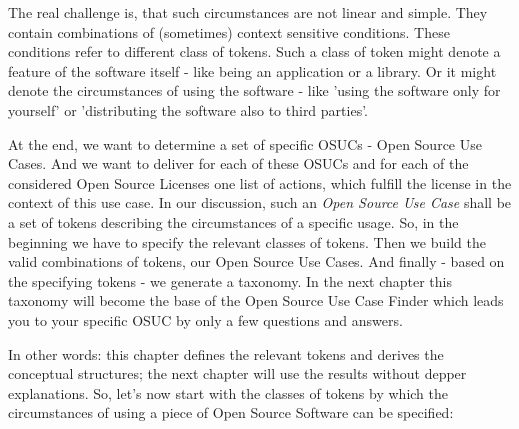 The real challenge is, that such circumstances are not linear and simple. They
contain combinations of (sometimes) context sensitive conditions. These
conditions refer to different class of tokens. Such a class of token might
denote a feature of the software itself - like being an application or a library. Or
it might denote the circumstances of using the software -
like 'using the software only for yourself' or 'distributing the software also
to third parties'.

At the end, we want to determine a set of specific OSUCs - Open Source Use
Cases. And we want to deliver for each of these OSUCs and for each of the
considered Open Source Licenses one list of actions, which fulfill the license
in the context of this use case. In our discussion, such an \textit{Open Source
Use Case} shall be a set of tokens describing the circumstances of a specific
usage. So, in the beginning we have to specify the relevant classes of tokens.
Then we build the valid combinations of tokens, our Open Source Use Cases. And
finally - based on the specifying tokens - we generate a taxonomy. In the
next chapter this taxonomy will become the base of the Open Source Use Case
Finder which leads you to your specific OSUC by only a few questions and
answers. 

In other words: this chapter defines the relevant tokens and derives the
conceptual structures; the next chapter will use the results without depper
explanations. So, let's now start with the classes of tokens by which the
circumstances of using a piece of Open Source Software can be specified:

